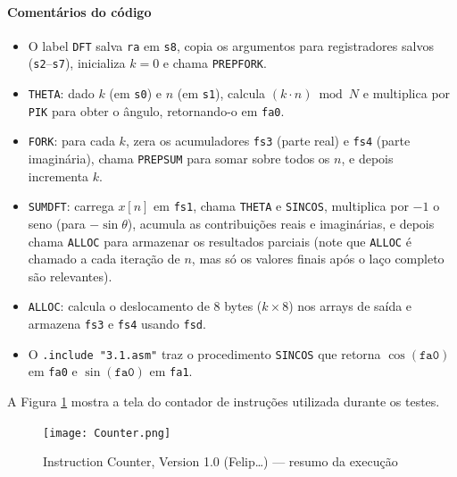 \documentclass[12pt,a4paper]{article}
\begin{document}
\paragraph{Comentários do código}
\begin{itemize}
    \item O label \texttt{DFT} salva \texttt{ra} em \texttt{s8}, copia os argumentos para registradores salvos (\texttt{s2}–\texttt{s7}), inicializa $k=0$ e chama \texttt{PREPFORK}.
    \item \texttt{THETA}: dado $k$ (em \texttt{s0}) e $n$ (em \texttt{s1}), calcula $(k \cdot n) \bmod N$ e multiplica por \texttt{PIK} para obter o ângulo, retornando-o em \texttt{fa0}.
    \item \texttt{FORK}: para cada $k$, zera os acumuladores \texttt{fs3} (parte real) e \texttt{fs4} (parte imaginária), chama \texttt{PREPSUM} para somar sobre todos os $n$, e depois incrementa $k$.
    \item \texttt{SUMDFT}: carrega $x[n]$ em \texttt{fs1}, chama \texttt{THETA} e \texttt{SINCOS}, multiplica por $-1$ o seno (para $-\sin\theta$), acumula as contribuições reais e imaginárias, e depois chama \texttt{ALLOC} para armazenar os resultados parciais (note que \texttt{ALLOC} é chamado a cada iteração de $n$, mas só os valores finais após o laço completo são relevantes).
    \item \texttt{ALLOC}: calcula o deslocamento de 8 bytes ($k \times 8$) nos arrays de saída e armazena \texttt{fs3} e \texttt{fs4} usando \texttt{fsd}.
    \item O \texttt{.include "3.1.asm"} traz o procedimento \texttt{SINCOS} que retorna $\cos(\texttt{fa0})$ em \texttt{fa0} e $\sin(\texttt{fa0})$ em \texttt{fa1}.
\end{itemize}

A Figura \ref{fig:counter} mostra a tela do contador de instruções utilizada durante os testes.
\begin{figure}[H]
\centering
\texttt{[image: Counter.png]}
\caption{Instruction Counter, Version 1.0 (Felip\dots) — resumo da execução}
\label{fig:counter}
\end{figure}
\end{document}
